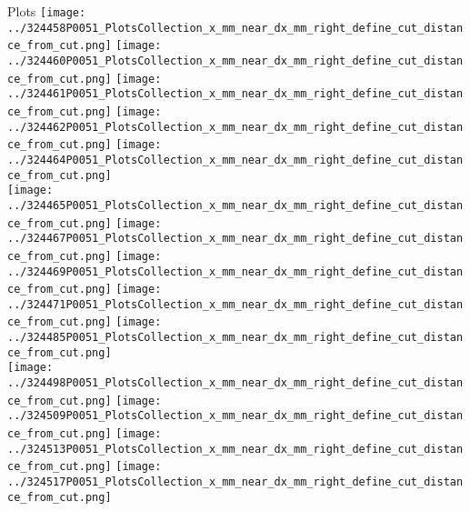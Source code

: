 \documentclass{beamer}
\begin{document}
\begin{frame}\tiny
        \begin{block}{Plots}
		  \centering
                \texttt{[image: ../324458P0051\_PlotsCollection\_x\_mm\_near\_dx\_mm\_right\_define\_cut\_distance\_from\_cut.png]}
                \texttt{[image: ../324460P0051\_PlotsCollection\_x\_mm\_near\_dx\_mm\_right\_define\_cut\_distance\_from\_cut.png]}
                \texttt{[image: ../324461P0051\_PlotsCollection\_x\_mm\_near\_dx\_mm\_right\_define\_cut\_distance\_from\_cut.png]}
                \texttt{[image: ../324462P0051\_PlotsCollection\_x\_mm\_near\_dx\_mm\_right\_define\_cut\_distance\_from\_cut.png]}
                \texttt{[image: ../324464P0051\_PlotsCollection\_x\_mm\_near\_dx\_mm\_right\_define\_cut\_distance\_from\_cut.png]}\\
                \texttt{[image: ../324465P0051\_PlotsCollection\_x\_mm\_near\_dx\_mm\_right\_define\_cut\_distance\_from\_cut.png]}
                \texttt{[image: ../324467P0051\_PlotsCollection\_x\_mm\_near\_dx\_mm\_right\_define\_cut\_distance\_from\_cut.png]}
                \texttt{[image: ../324469P0051\_PlotsCollection\_x\_mm\_near\_dx\_mm\_right\_define\_cut\_distance\_from\_cut.png]}
                \texttt{[image: ../324471P0051\_PlotsCollection\_x\_mm\_near\_dx\_mm\_right\_define\_cut\_distance\_from\_cut.png]}
                \texttt{[image: ../324485P0051\_PlotsCollection\_x\_mm\_near\_dx\_mm\_right\_define\_cut\_distance\_from\_cut.png]}\\
                \texttt{[image: ../324498P0051\_PlotsCollection\_x\_mm\_near\_dx\_mm\_right\_define\_cut\_distance\_from\_cut.png]}
                \texttt{[image: ../324509P0051\_PlotsCollection\_x\_mm\_near\_dx\_mm\_right\_define\_cut\_distance\_from\_cut.png]}
                \texttt{[image: ../324513P0051\_PlotsCollection\_x\_mm\_near\_dx\_mm\_right\_define\_cut\_distance\_from\_cut.png]}
                \texttt{[image: ../324517P0051\_PlotsCollection\_x\_mm\_near\_dx\_mm\_right\_define\_cut\_distance\_from\_cut.png]}

\end{block}
\end{frame}
\end{document}

